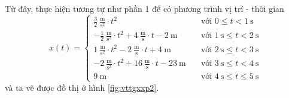 \documentclass[a4paper, titlepage, openany]{book}
\begin{document}
Từ đây, thực hiện tương tự như phần 1 để có phương trình vị trí - thời gian
\begin{equation*}
   x(t) = \begin{cases}
      \frac{3}{2}\ \frac{\text{m}}{\text{s}^2}\cdot t^2 &\quad \text{với } 0 \leq t < 1\ \text{s}\\
      -\frac{1}{2}\ \frac{\text{m}}{\text{s}^2}\cdot t^2 + 4\ \frac{\text{m}}{\text{s}}\cdot t - 2\ \text{m}&\quad \text{với } 1\ \text{s} \leq t < 2\ \text{s}\\
      1\ \frac{\text{m}}{\text{s}^2}\cdot t^2 - 2\ \frac{\text{m}}{\text{s}}\cdot t + 4\ \text{m}&\quad \text{với } 2\ \text{s} \leq t < 3\ \text{s}\\
      -2\ \frac{\text{m}}{\text{s}^2}\cdot t^2+16\ \frac{\text{m}}{\text{s}}\cdot t-23\ \text{m}&\quad \text{với } 3\ \text{s} \leq t < 4\ \text{s}\\
      9\ \text{m}&\quad \text{với } 4\ \text{s} \leq t \leq 5\ \text{s}
   \end{cases}
\end{equation*}
và ta vẽ được đồ thị ở hình \ref{fig:vttgxxp2}.
\end{document}
